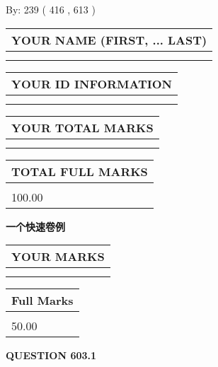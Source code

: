 \documentclass{ctexart}
\begin{document}
   
\hspace{1.0in} By: 
 239 ( 416 ,  613 )
   
   
   
   
\newpage 
\setcounter{page}{ 
   603001 } 
   
   
   
   
\noindent\begin{tabular}{|l|}
\hline
YOUR NAME (FIRST, ... LAST)  \\
\hline
 \\ 
 \\ 
\hline
\end{tabular}
\hspace{0.05in} \begin{tabular}{|l|}
\hline
 YOUR   ID   INFORMATION  \\
\hline
 \\ 
 \\ 
\hline
\end{tabular}
   
   
\vspace{0.2in}\noindent\begin{tabular}{|l|}
\hline
YOUR TOTAL MARKS  \\
\hline
 \\ 
 \\ 
\hline
\end{tabular}
\hspace{0.05in} \begin{tabular}{|l|}
\hline
TOTAL FULL MARKS  \\
\hline
 \\ 
100.00 \\
\hline
\end{tabular}
   
   
 \vspace{0.2in}
{\LARGE {\textbf{ 一个快速卷例}}}
   
   
  
\vspace{0.2in}
  
\noindent\begin{tabular}{|l|}
\hline
 YOUR MARKS  \\
\hline
 \\ 
 \\ 
\hline
\end{tabular}
\hspace{0.05in} \begin{tabular}{|l|}
\hline
 Full Marks  \\
\hline
 \\ 
50.00 \\
\hline
\end{tabular}
{\textbf{\Large{QUESTION
603.1 
}}}
  
\end{document}
